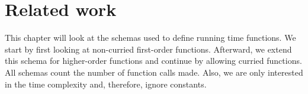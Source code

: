
\chapter{Related work}\label{chapter:relwork}

This chapter will look at the schemas used to define running time functions.
We start by first looking at non-curried first-order functions.
Afterward, we extend this schema for higher-order functions and continue by allowing curried functions.
All schemas count the number of function calls made.
Also, we are only interested in the time complexity and, therefore, ignore constants.




